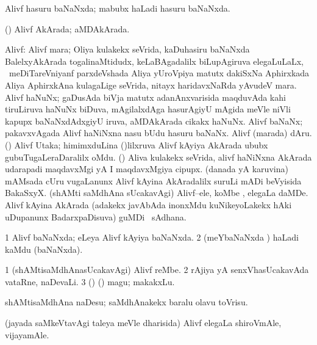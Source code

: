 \bentry
{}
\gl{\gu}
\bmng
Alivf hasuru baNaNxda; mabubx haLadi hasuru baNaNxda. 
\emng
\eentry

\bentry
{}
\gl{\gu}
\bmng
(\aMrashA) Alivf AkArada; aMDAkArada. 
\emng
\eentry

\bentry
{}
\gl{\nA}
\bmng
Alivf: 
\hypertarget{olive(1)a}{} 
\banum
{} Alivf mara; Oliya kulakekx seVrida, kaDuhasiru baNaNxda BalelxyAkArada togalinaMtidudx, keLaBAgadalilx biLupAgiruva elegaLuLaLx, \kanmu\ meDiTareVniyanf parxdeVshada Aliya yUroVpiya matutx dakiSxNa Aphirxkada Aliya AphirxkAna kulagaLige seVrida, nitayx haridavxNaRda yAvudeV mara.  
 Alivf haNuNx; gaDusAda biVja matutx adanAnxvarisida maqduvAda kahi tiruLiruva haNuNx biDuva, mAgilalxdAga hasurAgiyU mAgida meVle niVli kapupx baNaNxdAdxgiyU iruva, aMDAkArada cikakx haNuNx. 
\hypertarget{olive(1)c}{} 
 Alivf baNaNx; pakavxvAgada Alivf haNiNxna nasu bUdu hasuru baNaNx. 
\hypertarget{olive(1)d}{} 
 Alivf (marada) dAru. 
 (\aMrashA) Alivf Utaka; himimxduLina ()lilxruva Alivf kAyiya AkArada ububx gubuTugaLeraDaralilx oMdu. 
 (\pArxvi) Aliva kulakekx seVrida, alivf haNiNxna AkArada udarapadi maqdavxMgi yA I maqdavxMgiya cipupx. 
 (danada yA karuvina) mAMsada cUru \mo vugaLanunx Alivf kAyina AkAradalilx suruLi mADi beVyisida BakaSxyX. 
 (shAMti saMdhAna sUcakavAgi) Alivf--ele, koMbe , elegaLa daMDe. 
\hypertarget{olive(1)i}{} 
 Alivf kAyina AkArada (adakekx javAbAda inonxMdu kuNikeyoLakekx hAki uDupanunx BadarxpaDisuva) guMDi \mo\ sAdhana. 
\eanum
\emng
\eentry

\bentry
{}
\gl{\gu}
\bmng
\bnum
\num{1} Alivf baNaNxda; eLeya Alivf kAyiya baNaNxda. 
\num{2} (meYbaNaNxda \vi) haLadi kaMdu (baNaNxda). 
\enum
\emng
\eentry

\bentry
{}
\gl{\nA}
\bmng
\bnum
\num{1} (shAMtisaMdhAnasUcakavAgi) Alivf reMbe. 
\num{2} rAjiya yA senxVhasUcakavAda vataRne, naDevaLi. 
\num{3} (\beY) (\hA) magu; makakxLu. 
\enum
\emng

\noindent
\gl{\pagu}
\bmng
{} shAMtisaMdhAna naDesu; saMdhAnakekx baralu olavu toVrisu. 
\emng
\eentry

\bentry
{}
\gl{\nA}
\bmng
(jayada saMkeVtavAgi taleya meVle dharisida) Alivf elegaLa shiroVmAle, vijayamAle. 
\emng
\eentry

